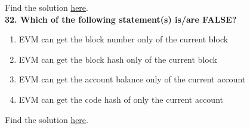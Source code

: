 Find the solution \hyperref[sec:exam1_q31]{here}.\\

\textbf{32. Which of the following statement(s) is/are FALSE?}

\begin{enumerate}[label=\Alph*.]
    \item EVM can get the block number only of the current block
    \item EVM can get the block hash only of the current block
    \item EVM can get the account balance only of the current account
    \item EVM can get the code hash of only the current account
\end{enumerate}

Find the solution \hyperref[sec:exam1_q32]{here}.\\